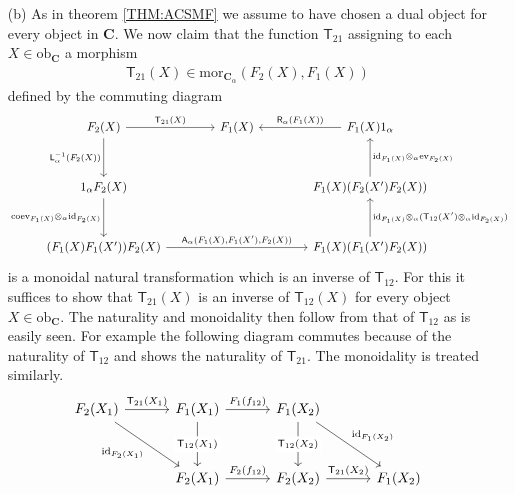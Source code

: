 \begin{prf}
\begin{enumerate}
\item[(b)]
As in theorem \ref{THM:ACSMF} we assume to have chosen a dual object for every object in $\mathbf{C}$. We now claim that the function $\mathsf{T}_{21}$ assigning to each $X \in \mathrm{ob}_{\mathbf{C}}$ a morphism
\begin{align*}
  \mathsf{T}_{21}(X)
  \in
  \mathrm{mor}_{\mathbf{C}_{\alpha}}(F_{2}(X),F_{1}(X))
\end{align*}
defined by the commuting diagram
\begin{equation*}
\begin{tikzcd}[row sep=3.2em,column sep=4em]
  F_{2}(X)
  \ar{r}{\mathsf{T}_{21}(X)}
  \ar{d}[swap]{\mathsf{L}_{\alpha}^{-1}(F_{2}(X))}
  &
  F_{1}(X)
  &
  F_{1}(X) 1_{\alpha}
  \ar{l}[swap]{\mathsf{R}_{\alpha}(F_{1}(X))}
  \\
  1_{\alpha} F_{2}(X)
  \ar{d}[swap]{\mathrm{coev}_{F_{1}(X)} \otimes_{\alpha} \mathrm{id}_{F_{2}(X)}}
  &
  &
  F_{1}(X) (F_{2}(X^{\prime}) F_{2}(X))
  \ar{u}[swap]{\mathrm{id}_{F_{1}(X)} \otimes_{\alpha} \mathrm{ev}_{F_{2}(X)}}
  \\
  (F_{1}(X) F_{1}(X^{\prime})) F_{2}(X)
  \ar{rr}{\mathsf{A}_{\alpha}(F_{1}(X),F_{1}(X^{\prime}),F_{2}(X))}
  &
  &
  F_{1}(X) (F_{1}(X^{\prime}) F_{2}(X))
  \ar{u}[swap]{\mathrm{id}_{F_{1}(X)} \otimes_{\alpha} (\mathsf{T}_{12}(X^{\prime}) \otimes_{\alpha} \mathrm{id}_{F_{2}(X)})}
\end{tikzcd}
\end{equation*}
is a monoidal natural transformation which is an inverse of $\mathsf{T}_{12}$. For this it suffices to show that $\mathsf{T}_{21}(X)$ is an inverse of $\mathsf{T}_{12}(X)$ for every object $X \in \mathrm{ob}_{\mathbf{C}}$. The naturality and monoidality then follow from that of $\mathsf{T}_{12}$ as is easily seen. For example the following diagram commutes because of the naturality of $\mathsf{T}_{12}$ and shows the naturality of $\mathsf{T}_{21}$. The monoidality is treated similarly.
\begin{equation*}
\begin{tikzcd}[row sep=3.2em,column sep=3.2em]
  F_{2}(X_{1})
  \ar{r}{\mathsf{T}_{21}(X_{1})}
  \ar{rd}[swap]{\mathrm{id}_{F_{2}(X_{1})}}
  &
  F_{1}(X_{1})
  \ar{r}{F_{1}(f_{12})}
  \ar{d}[description]{\mathsf{T}_{12}(X_{1})}
  &
  F_{1}(X_{2})
  \ar{rd}{\mathrm{id}_{F_{1}(X_{2})}}
  \ar{d}[description]{\mathsf{T}_{12}(X_{2})}
  &
  \\
  &
  F_{2}(X_{1})
  \ar{r}{F_{2}(f_{12})}
  &
  F_{2}(X_{2})
  \ar{r}{\mathsf{T}_{21}(X_{2})}
  &
  F_{1}(X_{2})

\end{tikzcd}
\end{equation*}
\end{enumerate}
\end{prf}
